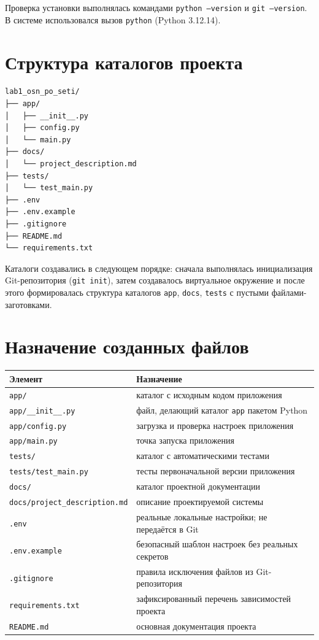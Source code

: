 \documentclass[12pt,a4paper]{article}
\begin{document}
Проверка установки выполнялась командами \texttt{python --version} и \texttt{git --version}. В системе использовался вызов \texttt{python} (Python 3.12.14).

\section{Структура каталогов проекта}

\begin{lstlisting}
lab1_osn_po_seti/
├── app/
│   ├── __init__.py
│   ├── config.py
│   └── main.py
├── docs/
│   └── project_description.md
├── tests/
│   └── test_main.py
├── .env
├── .env.example
├── .gitignore
├── README.md
└── requirements.txt
\end{lstlisting}

Каталоги создавались в следующем порядке: сначала выполнялась инициализация Git-репозитория (\texttt{git init}), затем создавалось виртуальное окружение и после этого формировалась структура каталогов \texttt{app}, \texttt{docs}, \texttt{tests} с пустыми файлами-заготовками.

\section{Назначение созданных файлов}

\small\begin{tabularx}{\linewidth}{|p{3.8cm}|X|}
\hline
Элемент & Назначение \\ \hline
\texttt{app/\allowbreak{}} & каталог с исходным кодом приложения \\ \hline
\texttt{app/\allowbreak{}\_\_init\_\_.\allowbreak{}py} & файл, делающий каталог \texttt{app} пакетом Python \\ \hline
\texttt{app/\allowbreak{}config.\allowbreak{}py} & загрузка и проверка настроек приложения \\ \hline
\texttt{app/\allowbreak{}main.\allowbreak{}py} & точка запуска приложения \\ \hline
\texttt{tests/\allowbreak{}} & каталог с автоматическими тестами \\ \hline
\texttt{tests/\allowbreak{}test\_main.\allowbreak{}py} & тесты первоначальной версии приложения \\ \hline
\texttt{docs/\allowbreak{}} & каталог проектной документации \\ \hline
\texttt{docs/\allowbreak{}project\_description.\allowbreak{}md} & описание проектируемой системы \\ \hline
\texttt{.\allowbreak{}env} & реальные локальные настройки; не передаётся в Git \\ \hline
\texttt{.\allowbreak{}env.\allowbreak{}example} & безопасный шаблон настроек без реальных секретов \\ \hline
\texttt{.\allowbreak{}gitignore} & правила исключения файлов из Git-репозитория \\ \hline
\texttt{requirements.\allowbreak{}txt} & зафиксированный перечень зависимостей проекта \\ \hline
\texttt{README.\allowbreak{}md} & основная документация проекта \\ \hline
\end{tabularx}\normalsize
\end{document}

